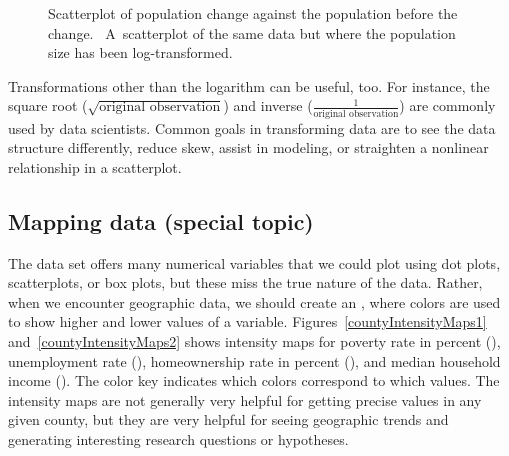 \begin{figure}
  \centering
  \caption{
      Scatterplot of population change
      against the population before the change.
      ~A~scatterplot
      of the same data but where the population
      size has been log-transformed.}
  \label{county_pop_change_v_pop_transform_main}
\end{figure}

Transformations other than the logarithm can be useful, too.
For instance, the square root
($\sqrt{\text{original observation}}$) and inverse
($\frac{1}{\text{original observation}}$) are commonly used
by data scientists.
Common goals in transforming data are to see the data
structure differently, reduce skew, assist in modeling,
or straighten a nonlinear relationship in a scatterplot.



\subsection{Mapping data (special topic)}


The  data set offers many numerical variables
that we could plot using dot plots, scatterplots,
or box plots, but these miss the true nature of the data.
Rather, when we encounter geographic data, we should create
an , where colors are used
to show higher and lower values of a variable.
Figures~\ref{countyIntensityMaps1}
and~\ref{countyIntensityMaps2} shows intensity maps for
poverty rate in percent (),
unemployment rate (),
homeownership rate in percent (),
and median household income
().
The color key indicates which colors correspond to which values.
The intensity maps are not generally very helpful
for getting precise values in any given county,
but they are very helpful for seeing geographic trends
and generating interesting research questions or hypotheses.

